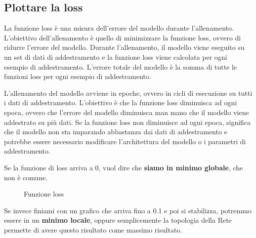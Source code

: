 \subsection{Plottare la loss}

La funzione loss è una misura dell'errore del modello durante
l'allenamento. L'obiettivo dell'allenamento è quello di minimizzare la funzione
loss, ovvero di ridurre l'errore del modello. Durante l'allenamento, il modello
viene eseguito su un set di dati di addestramento e la funzione loss viene
calcolata per ogni esempio di addestramento. L'errore totale del modello è la
somma di tutte le funzioni loss per ogni esempio di addestramento.

L'allenamento del modello avviene in epoche, ovvero in cicli di esecuzione su
tutti i dati di addestramento. L'obiettivo è che la funzione loss diminuisca ad
ogni epoca, ovvero che l'errore del modello diminuisca man mano che il modello
viene addestrato su più dati. Se la funzione loss non diminuisce ad ogni epoca,
significa che il modello non sta imparando abbastanza dai dati di addestramento
e potrebbe essere necessario modificare l'architettura del modello o i
parametri di addestramento.

Se la funzione di loss arriva a 0, vuol dire che \textbf{siamo in minimo globale}, che non è comune.

\begin{figure}[H]
    \begin{center}
    \end{center}
    \caption{Funzione loss}
\end{figure}


Se invece finiami con un grafico che arriva fino a 0.1 e poi si stabilizza, 
potremmo essere in un \textbf{minimo locale}, oppure semplicemente la topologia della Rete
permette di avere questo risultato come massimo risultato.


